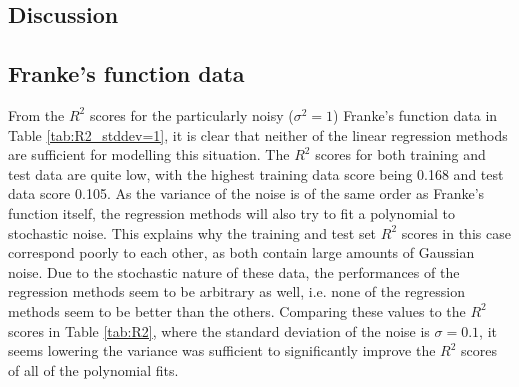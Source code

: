 \documentclass[a4paper, 10pt]{article}
\begin{document}
\begin{multicols}{2}


\section{Discussion}
\subsection{Franke's function data}
From the $R^2$ scores for the particularly noisy ($\sigma^2 = 1$) Franke's function data in Table \ref{tab:R2_stddev=1}, it is clear that neither of the linear regression methods are sufficient for modelling this situation. The $R^2$ scores for both training and test data are quite low, with the highest training data score being 0.168 and test data score 0.105. As the variance of the noise is of the same order as Franke's function itself, the regression methods will also try to fit a polynomial to stochastic noise. This explains why the training and test set $R^2$ scores in this case correspond poorly to each other, as both contain large amounts of Gaussian noise. Due to the stochastic nature of these data, the performances of the regression methods seem to be arbitrary as well, i.e. none of the regression methods seem to be better than the others. Comparing these values to the $R^2$ scores in Table \ref{tab:R2}, where the standard deviation of the noise is $\sigma=0.1$, it seems lowering the variance was sufficient to significantly improve the $R^2$ scores of all of the polynomial fits.



\end{multicols}
\end{document}
